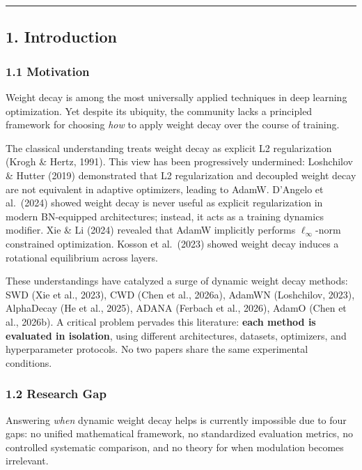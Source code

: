 \documentclass[
]{article}
\begin{document}
\begin{center}\rule{0.5\linewidth}{0.5pt}\end{center}

\hypertarget{introduction}{%
\subsection{1. Introduction}\label{introduction}}

\hypertarget{motivation}{%
\subsubsection{1.1 Motivation}\label{motivation}}

Weight decay is among the most universally applied techniques in deep
learning optimization. Yet despite its ubiquity, the community lacks a
principled framework for choosing \emph{how} to apply weight decay over
the course of training.

The classical understanding treats weight decay as explicit L2
regularization (Krogh \& Hertz, 1991). This view has been progressively
undermined: Loshchilov \& Hutter (2019) demonstrated that L2
regularization and decoupled weight decay are not equivalent in adaptive
optimizers, leading to AdamW. D'Angelo et al.~(2024) showed weight decay
is never useful as explicit regularization in modern BN-equipped
architectures; instead, it acts as a training dynamics modifier. Xie \&
Li (2024) revealed that AdamW implicitly performs \(\ell_\infty\)-norm
constrained optimization. Kosson et al.~(2023) showed weight decay
induces a rotational equilibrium across layers.

These understandings have catalyzed a surge of dynamic weight decay
methods: SWD (Xie et al., 2023), CWD (Chen et al., 2026a), AdamWN
(Loshchilov, 2023), AlphaDecay (He et al., 2025), ADANA (Ferbach et al.,
2026), AdamO (Chen et al., 2026b). A critical problem pervades this
literature: \textbf{each method is evaluated in isolation}, using
different architectures, datasets, optimizers, and hyperparameter
protocols. No two papers share the same experimental conditions.

\hypertarget{research-gap}{%
\subsubsection{1.2 Research Gap}\label{research-gap}}

Answering \emph{when} dynamic weight decay helps is currently impossible
due to four gaps: no unified mathematical framework, no standardized
evaluation metrics, no controlled systematic comparison, and no theory
for when modulation becomes irrelevant.
\end{document}
